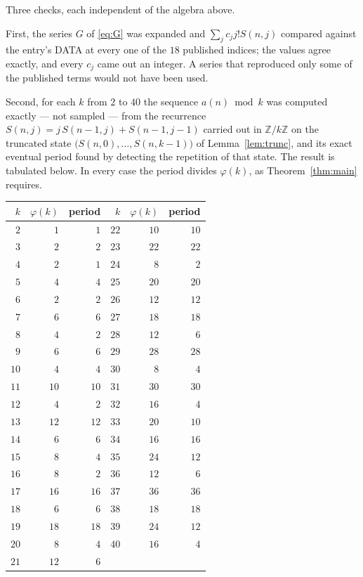 \documentclass[11pt,a4paper]{article}
\theoremstyle{plain}
\theoremstyle{definition}
\begin{document}
Three checks, each independent of the algebra above.

First, the series $G$ of \eqref{eq:G} was expanded and $\sum_j c_j j! S(n,j)$ compared
against the entry's DATA at every one of the $18$ published indices; the values
agree exactly, and every $c_j$ came out an integer. A series that reproduced only some of
the published terms would not have been used.

Second, for each $k$ from $2$ to $40$ the sequence $a(n)\bmod k$ was computed exactly
--- not sampled --- from the recurrence $S(n,j)=j\,S(n-1,j)+S(n-1,j-1)$ carried out in
$\mathbb{Z}/k\mathbb{Z}$ on the truncated state
$\bigl(S(n,0),\dots,S(n,k-1)\bigr)$ of Lemma~\ref{lem:trunc}, and its exact eventual
period found by detecting the repetition of that state. The result is tabulated below.
In every case the period divides $\varphi(k)$, as Theorem~\ref{thm:main} requires.

\begin{center}\small
\begin{tabular}{rrr@{\qquad\qquad}rrr}
$k$ & $\varphi(k)$ & period & $k$ & $\varphi(k)$ & period \\ \hline
$2$ & $1$ & $1$ & $22$ & $10$ & $10$ \\
$3$ & $2$ & $2$ & $23$ & $22$ & $22$ \\
$4$ & $2$ & $1$ & $24$ & $8$ & $2$ \\
$5$ & $4$ & $4$ & $25$ & $20$ & $20$ \\
$6$ & $2$ & $2$ & $26$ & $12$ & $12$ \\
$7$ & $6$ & $6$ & $27$ & $18$ & $18$ \\
$8$ & $4$ & $2$ & $28$ & $12$ & $6$ \\
$9$ & $6$ & $6$ & $29$ & $28$ & $28$ \\
$10$ & $4$ & $4$ & $30$ & $8$ & $4$ \\
$11$ & $10$ & $10$ & $31$ & $30$ & $30$ \\
$12$ & $4$ & $2$ & $32$ & $16$ & $4$ \\
$13$ & $12$ & $12$ & $33$ & $20$ & $10$ \\
$14$ & $6$ & $6$ & $34$ & $16$ & $16$ \\
$15$ & $8$ & $4$ & $35$ & $24$ & $12$ \\
$16$ & $8$ & $2$ & $36$ & $12$ & $6$ \\
$17$ & $16$ & $16$ & $37$ & $36$ & $36$ \\
$18$ & $6$ & $6$ & $38$ & $18$ & $18$ \\
$19$ & $18$ & $18$ & $39$ & $24$ & $12$ \\
$20$ & $8$ & $4$ & $40$ & $16$ & $4$ \\
$21$ & $12$ & $6$ &  & & \\
\end{tabular}
\end{center}
\end{document}
